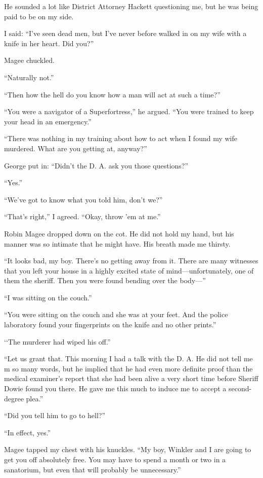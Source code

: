 \documentclass{novel}
\begin{document}
He sounded a lot like District Attorney Hackett questioning me, but he was being paid to be on my side. 

I said: “I’ve seen dead men, but I’ve never before walked in on my wife with a knife in her heart. Did you?”

Magee chuckled. 

“Naturally not.”

“Then how the hell do you know how a man will act at such a time?”

“You were a navigator of a Superfortress,” he argued. “You were trained to keep your head in an emergency.”

“There was nothing in my training about how to act when I found my wife murdered. What are you getting at, anyway?”

George put in: “Didn’t the D. A. ask you those questions?”

“Yes.”

“We’ve got to know what you told him, don’t we?”

“That’s right,” I agreed. “Okay, throw ’em at me.”

Robin Magee dropped down on the cot. He did not hold my hand, but his manner was so intimate that he might have. His breath made me thirsty. 

“It looks bad, my boy. There’s no getting away from it. There are many witnesses that you left your house in a highly excited state of mind—unfortunately, one of them the sheriff. Then you were found bending over the body—”

“I was sitting on the couch.”

“You were sitting on the couch and she was at your feet. And the police laboratory found your fingerprints on the knife and no other prints.”

‘‘The murderer had wiped his off.”

“Let us grant that. This morning I had a talk with the D. A. He did not tell me m so many words, but he implied that he had even more definite proof than the medical examiner’s report that she had been alive a very short time before Sheriff Dowie found you there. He gave me this much to induce me to accept a second-degree plea.”

“Did you tell him to go to hell?”

“In effect, yes.”

Magee tapped my chest with his knuckles. “My boy, Winkler and I are going to get you off absolutely free. You may have to spend a month or two in a sanatorium, but even that will probably be unnecessary.”
\end{document}
